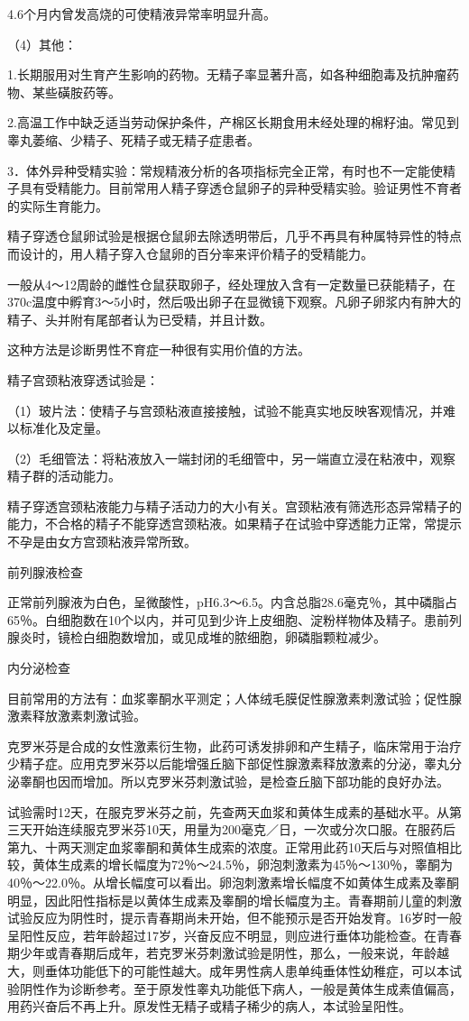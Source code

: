 \documentclass[12pt,UTF8,openany]{ctexbook}
\begin{document}
4.6个月内曾发高烧的可使精液异常率明显升高。

（4）其他：

1.长期服用对生育产生影响的药物。无精子率显著升高，如各种细胞毒及抗肿瘤药物、某些磺胺药等。

2.高温工作中缺乏适当劳动保护条件，产棉区长期食用未经处理的棉籽油。常见到睾丸萎缩、少精子、死精子或无精子症患者。

3．体外异种受精实验：常规精液分析的各项指标完全正常，有时也不一定能使精子具有受精能力。目前常用人精子穿透仓鼠卵子的异种受精实验。验证男性不育者的实际生育能力。

精子穿透仓鼠卵试验是根据仓鼠卵去除透明带后，几乎不再具有种属特异性的特点而设计的，用人精子穿入仓鼠卵的百分率来评价精子的受精能力。

一般从4～12周龄的雌性仓鼠获取卵子，经处理放入含有一定数量已获能精子，在370c温度中孵育3～5小时，然后吸出卵子在显微镜下观察。凡卵子卵浆内有肿大的精子、头并附有尾部者认为已受精，并且计数。

这种方法是诊断男性不育症一种很有实用价值的方法。

精子宫颈粘液穿透试验是：

（1）玻片法：使精子与宫颈粘液直接接触，试验不能真实地反映客观情况，并难以标准化及定量。

（2）毛细管法：将粘液放入一端封闭的毛细管中，另一端直立浸在粘液中，观察精子群的活动能力。

精子穿透宫颈粘液能力与精子活动力的大小有关。宫颈粘液有筛选形态异常精子的能力，不合格的精子不能穿透宫颈粘液。如果精子在试验中穿透能力正常，常提示不孕是由女方宫颈粘液异常所致。

前列腺液检查

正常前列腺液为白色，呈微酸性，pH6.3～6.5。内含总脂28.6毫克％，其中磷脂占65％。白细胞数在10个以内，并可见到少许上皮细胞、淀粉样物体及精子。患前列腺炎时，镜检白细胞数增加，或见成堆的脓细胞，卵磷脂颗粒减少。

内分泌检查

目前常用的方法有：血浆睾酮水平测定；人体绒毛膜促性腺激素刺激试验；促性腺激素释放激素刺激试验。

克罗米芬是合成的女性激素衍生物，此药可诱发排卵和产生精子，临床常用于治疗少精子症。应用克罗米芬以后能增强丘脑下部促性腺激素释放激素的分泌，睾丸分泌睾酮也因而增加。所以克罗米芬刺激试验，是检查丘脑下部功能的良好办法。

试验需时12天，在服克罗米芬之前，先查两天血浆和黄体生成素的基础水平。从第三天开始连续服克罗米芬10天，用量为200毫克／日，一次或分次口服。在服药后第九、十两天测定血浆睾酮和黄体生成索的浓度。正常用此药10天后与对照值相比较，黄体生成素的增长幅度为72％～24.5％，卵泡刺激素为45％～130％，睾酮为40％～22.0％。从增长幅度可以看出。卵泡刺激素增长幅度不如黄体生成素及睾酮明显，因此阳性指标是以黄体生成素及睾酮的增长幅度为主。青春期前儿童的刺激试验反应为阴性时，提示青春期尚未开始，但不能预示是否开始发育。16岁时一般呈阳性反应，若年龄超过17岁，兴奋反应不明显，则应进行垂体功能检查。在青春期少年或青春期后成年，若克罗米芬刺激试验是阴性，那么，一般来说，年龄越大，则垂体功能低下的可能性越大。成年男性病人患单纯垂体性幼稚症，可以本试验阴性作为诊断参考。至于原发性睾丸功能低下病人，一般是黄体生成素值偏高，用药兴奋后不再上升。原发性无精子或精子稀少的病人，本试验呈阳性。
\end{document}

